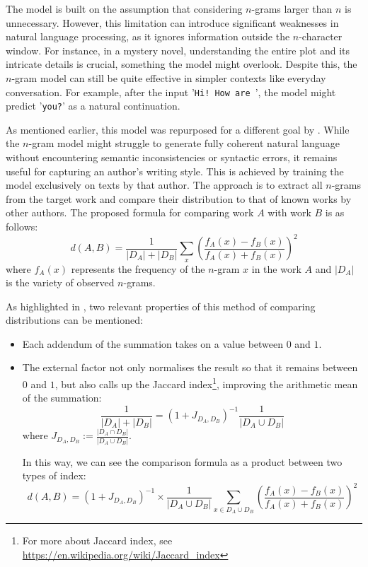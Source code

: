 \noindent The model is built on the assumption that considering $n$-grams larger than $n$ is unnecessary. However, this limitation can introduce significant weaknesses in natural language processing, as it ignores information outside the $n$-character window. For instance, in a mystery novel, understanding the entire plot and its intricate details is crucial, something the model might overlook. Despite this, the $n$-gram model can still be quite effective in simpler contexts like everyday conversation. For example, after the input '\texttt{Hi! How are }', the model might predict '\texttt{you?}' as a natural continuation.

\noindent As mentioned earlier, this model was repurposed for a different goal by \citet{SapAttribution}. While the $n$-gram model might struggle to generate fully coherent natural language without encountering semantic inconsistencies or syntactic errors, it remains useful for capturing an author's writing style. This is achieved by training the model exclusively on texts by that author. The approach is to extract all $n$-grams from the target work and compare their distribution to that of known works by other authors. The proposed formula for comparing work $A$ with work $B$ is as follows:
\begin{equation}
	d(A,B) = \frac{1}{|D_A|+|D_B|}\sum_x\left(\frac{f_A(x)-f_B(x)}{f_A(x)+f_B(x)}\right)^2
	\label{eq:SapAttribution_dist}
\end{equation}
where $f_A(x)$ represents the frequency of the $n$-gram $x$ in the work $A$ and $|D_A|$ is the variety of observed $n$-grams.

\noindent As highlighted in \cite{thesis}, two relevant properties of this method of comparing distributions can be mentioned:
\begin{itemize}
	\item Each addendum of the summation takes on a value between $0$ and $1$.
	\item The external factor not only normalises the result so that it remains between $0$ and $1$, but also calls up the Jaccard index\footnote{For more about Jaccard index, see \url{https://en.wikipedia.org/wiki/Jaccard_index}}, improving the arithmetic mean of the summation:
	\[
		\frac{1}{|D_A|+|D_B|} = (1+J_{D_A,D_B})^{-1}\frac{1}{|D_A\cup D_B|}
	\]
	\noindent where $J_{D_A,D_B} := \frac{\left|D_A\cap D_B\right|}{\left|D_A\cup D_B\right|}$.

	\noindent In this way, we can see the comparison formula as a product between two types of index:
	\[
		d(A,B)=(1+J_{D_A, D_B})^{-1} \times \frac{1}{\left|D_A\cup D_B\right|}\sum_{x\in D_A\cup D_B}\left(\frac{f_A(x)-f_B(x)}{f_A(x)+f_B(x)}\right)^2
	\]
\end{itemize}

